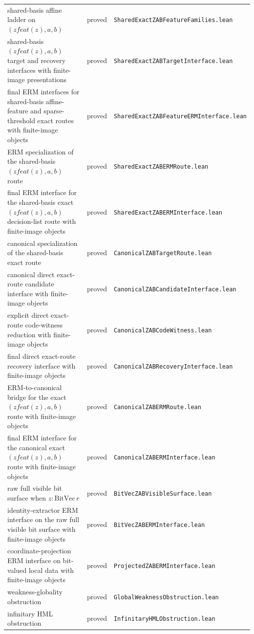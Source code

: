 \documentclass[11pt]{article}
\theoremstyle{remark}
\begin{document}
\begin{center}
\begin{tabular}{lll}
shared-basis affine ladder on $(zfeat(z),a,b)$ & proved & \texttt{SharedExactZABFeatureFamilies.lean} \\
shared-basis $(zfeat(z),a,b)$ target and recovery interfaces with finite-image presentations & proved & \texttt{SharedExactZABTargetInterface.lean} \\
final ERM interfaces for shared-basis affine-feature and sparse-threshold exact routes with finite-image objects & proved & \texttt{SharedExactZABFeatureERMInterface.lean} \\
ERM specialization of the shared-basis $(zfeat(z),a,b)$ route & proved & \texttt{SharedExactZABERMRoute.lean} \\
final ERM interface for the shared-basis exact $(zfeat(z),a,b)$ decision-list route with finite-image objects & proved & \texttt{SharedExactZABERMInterface.lean} \\
canonical specialization of the shared-basis exact route & proved & \texttt{CanonicalZABTargetRoute.lean} \\
canonical direct exact-route candidate interface with finite-image objects & proved & \texttt{CanonicalZABCandidateInterface.lean} \\
explicit direct exact-route code-witness reduction with finite-image objects & proved & \texttt{CanonicalZABCodeWitness.lean} \\
final direct exact-route recovery interface with finite-image objects & proved & \texttt{CanonicalZABRecoveryInterface.lean} \\
ERM-to-canonical bridge for the exact $(zfeat(z),a,b)$ route with finite-image objects & proved & \texttt{CanonicalZABERMRoute.lean} \\
final ERM interface for the canonical exact $(zfeat(z),a,b)$ route with finite-image objects & proved & \texttt{CanonicalZABERMInterface.lean} \\
raw full visible bit surface when $z : \mathrm{BitVec}\, r$ & proved & \texttt{BitVecZABVisibleSurface.lean} \\
identity-extractor ERM interface on the raw full visible bit surface with finite-image objects & proved & \texttt{BitVecZABERMInterface.lean} \\
coordinate-projection ERM interface on bit-valued local data with finite-image objects & proved & \texttt{ProjectedZABERMInterface.lean} \\
weakness-globality obstruction & proved & \texttt{GlobalWeaknessObstruction.lean} \\
infinitary HML obstruction & proved & \texttt{InfinitaryHMLObstruction.lean} \\

\end{tabular}
\end{center}
\end{document}
